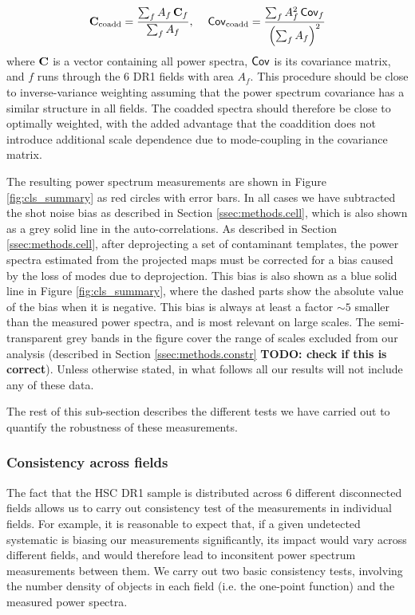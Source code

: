 \documentclass[a4paper,11pt]{article}
\newcommand{\todo}[1]{{\bf TODO: #1}}
\begin{document}
      \begin{equation}
        {\bf C}_{\rm coadd}=\frac{\sum_f A_f\,{\bf C}_f}{\sum_f A_f}, \hspace{12pt}{\sf Cov}_{\rm coadd}=\frac{\sum_f A_f^2\,{\sf Cov}_f}{\left(\sum_f A_f\right)^2}
      \end{equation}
      where ${\bf C}$ is a vector containing all power spectra, ${\sf Cov}$ is its covariance matrix, and $f$ runs through the 6 DR1 fields with area $A_f$. This procedure should be close to inverse-variance weighting assuming that the power spectrum covariance has a similar structure in all fields. The coadded spectra should therefore be close to optimally weighted, with the added advantage that the coaddition does not introduce additional scale dependence due to mode-coupling in the covariance matrix.
      
      The resulting power spectrum measurements are shown in Figure \ref{fig:cls_summary} as red circles with error bars. In all cases we have subtracted the shot noise bias as described in Section \ref{ssec:methods.cell}, which is also shown as a grey solid line in the auto-correlations. As described in Section \ref{ssec:methods.cell}, after deprojecting a set of contaminant templates, the power spectra estimated from the projected maps must be corrected for a bias caused by the loss of modes due to deprojection. This bias is also shown as a blue solid line in Figure \ref{fig:cls_summary}, where the dashed parts show the absolute value of the bias when it is negative. This bias is always at least a factor $\sim5$ smaller than the measured power spectra, and is most relevant on large scales. The semi-transparent grey bands in the figure cover the range of scales excluded from our analysis (described in Section \ref{ssec:methods.constr} \todo{check if this is correct}). Unless otherwise stated, in what follows all our results will not include any of these data.
      
      The rest of this sub-section describes the different tests we have carried out to quantify the robustness of these measurements.

    \subsubsection{Consistency across fields}\label{sssec:results.spectra.consistent}
      The fact that the HSC DR1 sample is distributed across 6 different disconnected fields allows us to carry out consistency test of the measurements in individual fields. For example, it is reasonable to expect that, if a given undetected systematic is biasing our measurements significantly, its impact would vary across different fields, and would therefore lead to inconsitent power spectrum measurements between them. We carry out two basic consistency tests, involving the number density of objects in each field (i.e. the one-point function) and the measured power spectra.
      
\end{document}
